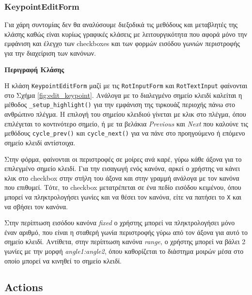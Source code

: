 \subsubsection{KeypointEditForm}
Για χάρη συντομίας δεν θα αναλύσουμε διεξοδικά τις μεθόδους και μεταβλητές της κλάσης καθώς είναι κυρίως γραφικές κλάσεις με λειτουργικότητα που αφορά μόνο την εμφάνιση και έλεγχο των checkboxes και των φορμών εισόδου γωνιών περιστροφής για την διαχείριση των κανόνων.

\noindent\textbf{Περιγραφή Κλάσης}

Η κλάση \texttt{KeypointEditForm} μαζί με τις \texttt{RotInputForm} και \texttt{RotTextInput} φαίνονται στο Σχήμα \ref{fig:edit_keypoint}. Ανάλογα με το διαλεγμένο σημείο κλειδί καλείται η μέθοδος \texttt{\_setup\_highlight()} για την εμφάνιση της τιρκουάζ περιοχής πάνω στο ανθρώπινο πλέγμα. Η επιλογή του σημείου κλειδιού γίνεται με κλικ στο πλέγμα, όπου επιλέγεται το κοντινότερο σημείο, ή με τα βελάκια \textsl{Previous} και \textsl{Next} που καλούνε τις μεθόδους \texttt{cycle\_prev()} και \texttt{cycle\_next()} για να πάνε στο προηγούμενο ή επόμενο σημείο κλειδί αντίστοιχα.

Στην φόρμα, φαίνονται οι περιστροφές σε μοίρες ανά καρέ, γύρω κάθε άξονα για το επιλεγμένο σημείο κλειδί. Για την εισαγωγή ενός κανόνα, αρκεί ο χρήστης να κάνει κλικ στο checkbox στην στήλη του άξονα και στην γραμμή ανάλογα με τον κανόνα που επιθυμεί. Τότε, το checkbox μετατρέπεται σε ένα πεδίο εισόδου κειμένου, όπου μπορεί να πληκτρολογήσει γωνίες και να θέσει τον κανόνα, είτε να πατήσει το \texttt{Χ} και να σβήσει τον κανόνα.

Στην περίπτωση εισόδου κανόνα \textsl{fixed} ο χρήστης μπορεί να πληκτρολογήσει μόνο έναν αριθμό, που είναι η σταθερή γωνία περιστροφής γύρω από τον άξονα για αυτό το σημείο κλειδί. Αντίθετα, στην περίπτωση κανόνα \textsl{range}, ο χρήστης μπορεί να βάλει 2 γωνίες με την μορφή \textit{angle1:angle2}, όπου καθορίζεται το διάστημα μοιρών μέσα στο οποίο μπορεί να κινηθεί το σημείο κλειδί.

\subsection{Actions}
\label{sec:abstract_actions}

